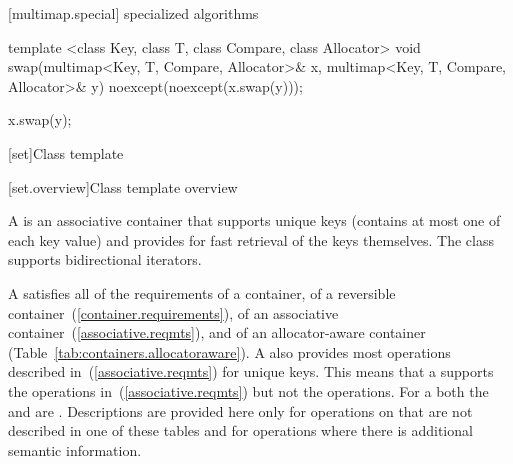 [multimap.special]{ specialized algorithms}

%
%
\begin{itemdecl}
template <class Key, class T, class Compare, class Allocator>
  void swap(multimap<Key, T, Compare, Allocator>& x,
            multimap<Key, T, Compare, Allocator>& y)
    noexcept(noexcept(x.swap(y)));
\end{itemdecl}

\begin{itemdescr}
\pnum
\effects
\begin{codeblock}
x.swap(y);
\end{codeblock}
\end{itemdescr}

[set]{Class template }

[set.overview]{Class template  overview}

\pnum
{}%
A
is an associative container that supports unique keys (contains at most one of each key value) and
provides for fast retrieval of the keys themselves.
The
 class
supports bidirectional iterators.

\pnum
A  satisfies all of the requirements of a container, of a reversible
container~(\ref{container.requirements}), of an associative
container~(\ref{associative.reqmts}), and of an allocator-aware container
(Table~\ref{tab:containers.allocatoraware}).
A
also provides most operations described in~(\ref{associative.reqmts})
for unique keys.
This means that a
supports the
operations in~(\ref{associative.reqmts})
but not the
operations.
For a
both the
and
are
.
Descriptions are provided here only for operations on
that are not described in one of these tables
and for operations where there is additional semantic information.

